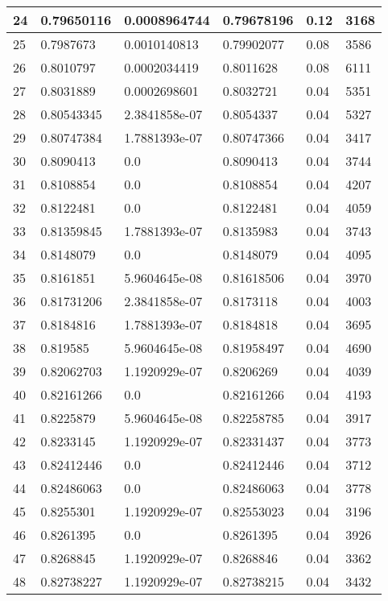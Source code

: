 \begin{longtable}{|l|l|l|l|l|l|}
24 & 0.79650116 & 0.0008964744 & 0.79678196 & 0.12 & 3168 \\ \hline 
25 & 0.7987673 & 0.0010140813 & 0.79902077 & 0.08 & 3586 \\ \hline 
26 & 0.8010797 & 0.0002034419 & 0.8011628 & 0.08 & 6111 \\ \hline 
27 & 0.8031889 & 0.0002698601 & 0.8032721 & 0.04 & 5351 \\ \hline 
28 & 0.80543345 & 2.3841858e-07 & 0.8054337 & 0.04 & 5327 \\ \hline 
29 & 0.80747384 & 1.7881393e-07 & 0.80747366 & 0.04 & 3417 \\ \hline 
30 & 0.8090413 & 0.0 & 0.8090413 & 0.04 & 3744 \\ \hline 
31 & 0.8108854 & 0.0 & 0.8108854 & 0.04 & 4207 \\ \hline 
32 & 0.8122481 & 0.0 & 0.8122481 & 0.04 & 4059 \\ \hline 
33 & 0.81359845 & 1.7881393e-07 & 0.8135983 & 0.04 & 3743 \\ \hline 
34 & 0.8148079 & 0.0 & 0.8148079 & 0.04 & 4095 \\ \hline 
35 & 0.8161851 & 5.9604645e-08 & 0.81618506 & 0.04 & 3970 \\ \hline 
36 & 0.81731206 & 2.3841858e-07 & 0.8173118 & 0.04 & 4003 \\ \hline 
37 & 0.8184816 & 1.7881393e-07 & 0.8184818 & 0.04 & 3695 \\ \hline 
38 & 0.819585 & 5.9604645e-08 & 0.81958497 & 0.04 & 4690 \\ \hline 
39 & 0.82062703 & 1.1920929e-07 & 0.8206269 & 0.04 & 4039 \\ \hline 
40 & 0.82161266 & 0.0 & 0.82161266 & 0.04 & 4193 \\ \hline 
41 & 0.8225879 & 5.9604645e-08 & 0.82258785 & 0.04 & 3917 \\ \hline 
42 & 0.8233145 & 1.1920929e-07 & 0.82331437 & 0.04 & 3773 \\ \hline 
43 & 0.82412446 & 0.0 & 0.82412446 & 0.04 & 3712 \\ \hline 
44 & 0.82486063 & 0.0 & 0.82486063 & 0.04 & 3778 \\ \hline 
45 & 0.8255301 & 1.1920929e-07 & 0.82553023 & 0.04 & 3196 \\ \hline 
46 & 0.8261395 & 0.0 & 0.8261395 & 0.04 & 3926 \\ \hline 
47 & 0.8268845 & 1.1920929e-07 & 0.8268846 & 0.04 & 3362 \\ \hline 
48 & 0.82738227 & 1.1920929e-07 & 0.82738215 & 0.04 & 3432 \\ \hline 

\end{longtable}
